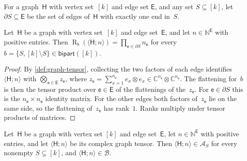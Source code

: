 \documentclass[11pt,letterpaper]{article}
\DeclareMathOperator{\tensorrank}{R}
\newcommand{\bipart}{\mathsf{bipart}}
\newcommand{\CC}{\mathbb{C}}
\newcommand{\NN}{\mathbb{N}}
\begin{document}
For a graph~$\mathsf{H}$ with vertex set~$[k]$ and edge set $\mathsf{E}$, and any set $S \subseteq [k]$, let~$\partial S \subseteq \mathsf{E}$ be the set of edges of~$\mathsf{H}$ with exactly one end in~$S$.

\begin{lemma}\label{lem:graph-flattening}
Let~$\mathsf{H}$ be a graph with vertex set~$[k]$ and edge set~$\mathsf{E}$, and let $n \in \NN^{\mathsf{E}}$ with positive entries. Then $\tensorrank_b(\langle \mathsf{H}; n \rangle) = \prod_{\mathsf{e} \in \partial S} n_{\mathsf{e}}$ for every $b = \{S, [k] \setminus S\} \in \bipart([k])$.
\end{lemma}
\begin{proof}
By \cref{def:graph-tensor}, collecting the two factors of each edge identifies $\langle \mathsf{H}; n \rangle$ with $\bigotimes_{\mathsf{e} \in \mathsf{E}} z_{\mathsf{e}}$, where $z_{\mathsf{e}} = \sum_{x=1}^{n_{\mathsf{e}}} e_x \otimes e_x \in \CC^{n_{\mathsf{e}}} \otimes \CC^{n_{\mathsf{e}}}$. The flattening for~$b$ is then the tensor product over $\mathsf{e} \in \mathsf{E}$ of the flattenings of the~$z_{\mathsf{e}}$. For $\mathsf{e} \in \partial S$ this is the $n_{\mathsf{e}} \times n_{\mathsf{e}}$ identity matrix. For the other edges both factors of~$z_{\mathsf{e}}$ lie on the same side, so the flattening of~$z_{\mathsf{e}}$ has rank~$1$. Ranks multiply under tensor products of matrices.
\end{proof}

\begin{proposition}\label{prop:graph-in-AC}
Let~$\mathsf{H}$ be a graph with vertex set $[k]$ and edge set~$\mathsf{E}$, let $n \in \NN^{\mathsf{E}}$ with positive entries, and let $\langle \mathsf{H}; n \rangle$ be its complex graph tensor. Then $\langle \mathsf{H}; n \rangle \in \mathcal{A}_S$ for every nonempty $S \subsetneq [k]$, and $\langle \mathsf{H}; n \rangle \in \mathcal{B}$.
\end{proposition}
\end{document}
